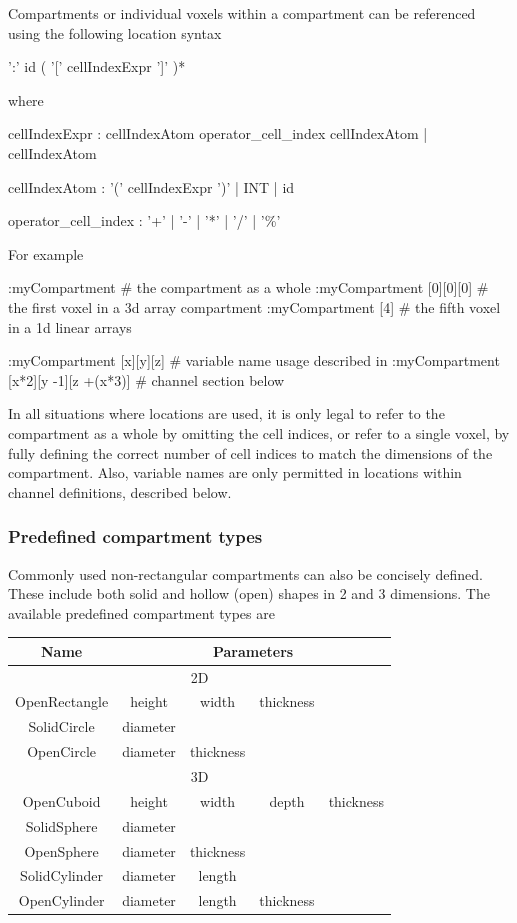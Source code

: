 Compartments or individual voxels within a compartment can be referenced using the following location syntax
\begin{bnfsource}
':' id ( '[' cellIndexExpr ']' )*
\end{bnfsource}
where
\begin{bnfsource}
cellIndexExpr :
  cellIndexAtom operator_cell_index cellIndexAtom
  | cellIndexAtom
  
cellIndexAtom :
  '(' cellIndexExpr ')'
  | INT
  | id
  
operator_cell_index :
  '+' | '-' | '*' | '/' | '\%'
\end{bnfsource}
For example
\begin{kappasource}
:myCompartment                     # the compartment as a whole
:myCompartment [0][0][0]           # the first voxel in a 3d array compartment
:myCompartment [4]                 # the fifth voxel in a 1d linear arrays

:myCompartment [x][y][z]           # variable name usage described in
:myCompartment [x*2][y -1][z +(x*3)] #   channel section below
\end{kappasource}

In all situations where locations are used, it is only legal to refer to the compartment as a whole by omitting the cell indices, or refer to a single voxel, by fully defining the correct number of cell indices to match the dimensions of the compartment. Also, variable names are only permitted in locations within channel definitions, described below.

\subsubsection{Predefined compartment types}

Commonly used non-rectangular compartments can also be concisely defined. These include both solid and hollow (open) shapes in 2 and 3 dimensions. The available predefined compartment types are

\medskip 

\begin{tabular}{|c|cccc|}
\hline
Name & \multicolumn{4}{|c|}{Parameters}\\ 
\hline
\multicolumn{5}{|c|}{2D}\\
\hline
OpenRectangle & height & width & thickness & \\
SolidCircle & diameter &  &  & \\
OpenCircle & diameter & thickness &  & \\
\hline
\multicolumn{5}{|c|}{3D}\\
\hline
OpenCuboid & height & width & depth & thickness\\
SolidSphere & diameter &  &  &  \\
OpenSphere & diameter & thickness &  & \\
SolidCylinder & diameter & length & & \\
OpenCylinder & diameter & length & thickness & \\
\hline
\end{tabular} 

